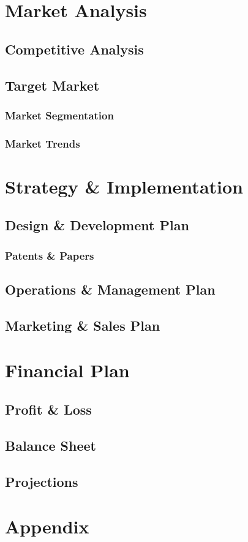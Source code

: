 \documentclass[titlepage]{article}
\begin{document}
\section{Market Analysis}
\subsection{Competitive Analysis}
\subsection{Target Market}
\subsubsection{Market Segmentation}
\subsubsection{Market Trends}

\section{Strategy \& Implementation}
\subsection{Design \& Development Plan}
\subsubsection{Patents \& Papers}
\subsection{Operations \& Management Plan}
\subsection{Marketing \& Sales Plan}

\section{Financial Plan}
\subsection{Profit \& Loss}
\subsection{Balance Sheet}
\subsection{Projections}

\section{Appendix}
\end{document}
